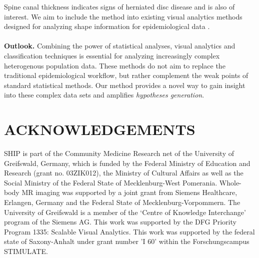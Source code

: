 \documentclass[a4paper,twoside]{style/article}
\begin{document}
Spine canal thickness indicates signs of herniated disc disease and is also of interest.
We aim to include the method into existing visual analytics methods designed for analyzing shape information for epidemiological data \cite{Klemm2014VIS}.
\\\\
\noindent \textbf{Outlook.}
Combining the power of statistical analyses, visual analytics and classification techniques is essential for analyzing increasingly complex heterogenous population data.
These methods do not aim to replace the traditional epidemiological workflow, but rather complement the weak points of standard statistical methods.
Our method provides a novel way to gain insight into these complex data sets and amplifies \emph{hypotheses generation}.
\section*{\uppercase{Acknowledgements}}
\begin{small}
\noindent SHIP is part of the Community Medicine Research net of the University of Greifswald, Germany, which is funded by the Federal Ministry of Education and Research (grant no. 03ZIK012), the Ministry of Cultural Affairs as well as the Social Ministry of the Federal State of Mecklenburg-West Pomerania. Whole-body MR imaging was supported by a joint grant from Siemens Healthcare, Erlangen, Germany and the Federal State of Mecklenburg-Vorpommern. The University of Greifswald is a member of the ‘Centre of Knowledge Interchange’ program of the Siemens AG. This work was supported by the DFG Priority Program 1335: Scalable Visual Analytics. This work was supported by the federal state of Saxony-Anhalt under grant number 'I 60' within the Forschungscampus STIMULATE.
\end{small}


{\small
}

\vfill
\end{document}
